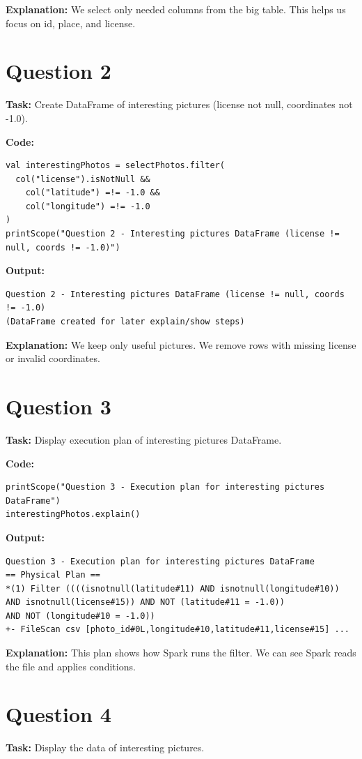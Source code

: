 \documentclass[11pt]{article}
\begin{document}
\textbf{Explanation:} We select only needed columns from the big table. This helps us focus on id, place, and license.

\section*{Question 2}
\textbf{Task:} Create DataFrame of interesting pictures (license not null, coordinates not -1.0).

\textbf{Code:}
\begin{lstlisting}
val interestingPhotos = selectPhotos.filter(
  col("license").isNotNull &&
    col("latitude") =!= -1.0 &&
    col("longitude") =!= -1.0
)
printScope("Question 2 - Interesting pictures DataFrame (license != null, coords != -1.0)")
\end{lstlisting}

\textbf{Output:}
\begin{lstlisting}
Question 2 - Interesting pictures DataFrame (license != null, coords != -1.0)
(DataFrame created for later explain/show steps)
\end{lstlisting}

\textbf{Explanation:} We keep only useful pictures. We remove rows with missing license or invalid coordinates.

\section*{Question 3}
\textbf{Task:} Display execution plan of interesting pictures DataFrame.

\textbf{Code:}
\begin{lstlisting}
printScope("Question 3 - Execution plan for interesting pictures DataFrame")
interestingPhotos.explain()
\end{lstlisting}

\textbf{Output:}
\begin{lstlisting}
Question 3 - Execution plan for interesting pictures DataFrame
== Physical Plan ==
*(1) Filter ((((isnotnull(latitude#11) AND isnotnull(longitude#10))
AND isnotnull(license#15)) AND NOT (latitude#11 = -1.0))
AND NOT (longitude#10 = -1.0))
+- FileScan csv [photo_id#0L,longitude#10,latitude#11,license#15] ...
\end{lstlisting}

\textbf{Explanation:} This plan shows how Spark runs the filter. We can see Spark reads the file and applies conditions.

\section*{Question 4}
\textbf{Task:} Display the data of interesting pictures.
\end{document}

